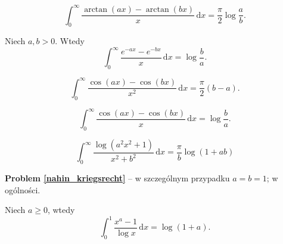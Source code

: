 \begin{problem}
    \begin{equation}
        \int_0^\infty \frac{\arctan (ax) - \arctan (bx)}{x} \,\mathrm{d}x = \frac \pi 2 \log \frac a b.
    \end{equation}
\end{problem}

\begin{problem}
    Niech $a, b > 0$.
    Wtedy
    \begin{equation}
        \int_0^\infty \frac{e^{-ax} - e^{-bx}}{x} \,\mathrm{d}x = \log \frac b a.
    \end{equation}
\end{problem}

\begin{problem}
    \begin{equation}
        \int_0^\infty \frac{\cos (ax) - \cos (bx)}{x^2} \,\mathrm{d}x = \frac \pi 2 (b - a).
    \end{equation}
\end{problem}

\begin{problem}
    \begin{equation}
        \int_0^\infty \frac{\cos (ax) - \cos (bx)}{x} \,\mathrm{d}x = \log \frac b a.
    \end{equation}
\end{problem}

\begin{problem}
    \label{nahin_kriegsrecht}
    \begin{equation}
        \int_0^\infty \frac{\log (a^2 x^2 + 1)}{x^2 + b^2} \,\mathrm{d}x = \frac \pi b \log (1 + ab)
    \end{equation}
\end{problem}

\textbf{Problem \ref{nahin_kriegsrecht}} -- \cite[s. 67]{nahin15} w szczególnym przypadku $a = b = 1$; \cite[s. 114, 375]{nahin15} w ogólności. %

\begin{problem}
    Niech $a \ge 0$, wtedy
    \begin{equation}
        \int_0^1 \frac{x^a - 1}{\log x} \,\mathrm{d}x = \log(1+a).
    \end{equation}
\end{problem}

